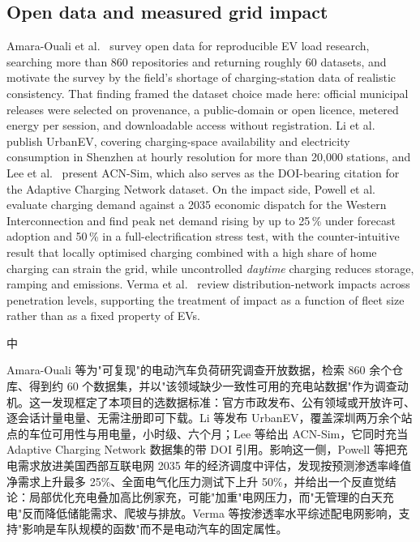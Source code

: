 \documentclass[10pt,a4paper]{article}
\newenvironment{zh}{%
  \par\vspace{1pt}%
  \begingroup
  \color{black!72}\small
  \setlength{\parskip}{0pt}%
  \noindent\textsf{\footnotesize 中}\hspace{3pt}\ignorespaces
}{%
  \par\endgroup\vspace{4pt}%
}
\begin{document}
\subsection{Open data and measured grid impact}

Amara-Ouali et al.~\cite{AmaraOuali2021EVLoadOpenDataReview} survey open data for reproducible EV
load research, searching more than 860 repositories and returning roughly 60 datasets, and motivate
the survey by the field's shortage of charging-station data of realistic consistency. That finding
framed the dataset choice made here: official municipal releases were selected on provenance, a
public-domain or open licence, metered energy per session, and downloadable access without
registration. Li et al.~\cite{Li2025UrbanEV} publish UrbanEV, covering charging-space availability
and electricity consumption in Shenzhen at hourly resolution for more than 20{,}000 stations, and
Lee et al.~\cite{Lee2021ACNSim} present ACN-Sim, which also serves as the DOI-bearing citation for
the Adaptive Charging Network dataset. On the impact side, Powell et
al.~\cite{Powell2022ChargingInfrastructureGridImpacts} evaluate charging demand against a 2035
economic dispatch for the Western Interconnection and find peak net demand rising by up to
25\,\% under forecast adoption and 50\,\% in a full-electrification stress test, with the
counter-intuitive result that locally optimised charging combined with a high share of home
charging can strain the grid, while uncontrolled \emph{daytime} charging reduces storage, ramping
and emissions. Verma et al.~\cite{Verma2021ReviewImpactsDistributionNetwork} review
distribution-network impacts across penetration levels, supporting the treatment of impact as a
function of fleet size rather than as a fixed property of EVs.

\begin{zh}
Amara-Ouali 等为"可复现"的电动汽车负荷研究调查开放数据，检索 860 余个仓库、得到约 60 个数据集，并以"该领域缺少一致性可用的充电站数据"作为调查动机。这一发现框定了本项目的选数据标准：官方市政发布、公有领域或开放许可、逐会话计量电量、无需注册即可下载。Li 等发布 UrbanEV，覆盖深圳两万余个站点的车位可用性与用电量，小时级、六个月；Lee 等给出 ACN-Sim，它同时充当 Adaptive Charging Network 数据集的带 DOI 引用。影响这一侧，Powell 等把充电需求放进美国西部互联电网 2035 年的经济调度中评估，发现按预测渗透率峰值净需求上升最多 25\%、全面电气化压力测试下上升 50\%，并给出一个反直觉结论：局部优化充电叠加高比例家充，可能"加重"电网压力，而"无管理的白天充电"反而降低储能需求、爬坡与排放。Verma 等按渗透率水平综述配电网影响，支持"影响是车队规模的函数"而不是电动汽车的固定属性。
\end{zh}
\end{document}
